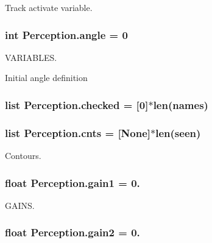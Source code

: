Track activate variable. 

\subsubsection[{\texorpdfstring{angle}{angle}}]{\setlength{\rightskip}{0pt plus 5cm}int Perception.\+angle = 0}\hypertarget{namespacePerception_a30f922540fc81da4abe1a1cf48cf96ac}{}\label{namespacePerception_a30f922540fc81da4abe1a1cf48cf96ac}


V\+A\+R\+I\+A\+B\+L\+ES. 

Initial angle definition 
\subsubsection[{\texorpdfstring{checked}{checked}}]{\setlength{\rightskip}{0pt plus 5cm}list Perception.\+checked = \mbox{[}0\mbox{]}$\ast$len({\bf names})}\hypertarget{namespacePerception_a47f799f9c4dfa904981d74938dcd5e49}{}\label{namespacePerception_a47f799f9c4dfa904981d74938dcd5e49}
\subsubsection[{\texorpdfstring{cnts}{cnts}}]{\setlength{\rightskip}{0pt plus 5cm}list Perception.\+cnts = \mbox{[}None\mbox{]}$\ast$len({\bf seen})}\hypertarget{namespacePerception_ae9b407646d9596cc4c837cadcc084168}{}\label{namespacePerception_ae9b407646d9596cc4c837cadcc084168}


Contours. 

\subsubsection[{\texorpdfstring{gain1}{gain1}}]{\setlength{\rightskip}{0pt plus 5cm}float Perception.\+gain1 = 0.}\hypertarget{namespacePerception_a353d9d2be3d3ef1de098a6dd0354b5fe}{}\label{namespacePerception_a353d9d2be3d3ef1de098a6dd0354b5fe}


G\+A\+I\+NS. 

\subsubsection[{\texorpdfstring{gain2}{gain2}}]{\setlength{\rightskip}{0pt plus 5cm}float Perception.\+gain2 = 0.}\hypertarget{namespacePerception_a2520defc2fe01293181f48cc9c93d552}{}\label{namespacePerception_a2520defc2fe01293181f48cc9c93d552}
